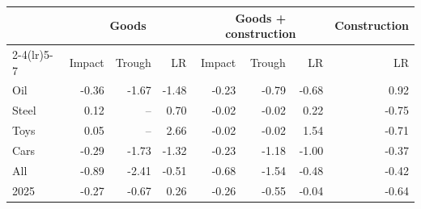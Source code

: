 \begin{tabular}{lrrrrrrr}
\toprule
 & \multicolumn{3}{c}{Goods} & \multicolumn{3}{c}{Goods + construction} & Construction \\
\cmidrule(lr){2-4}\cmidrule(lr){5-7}
 & Impact & Trough & LR & Impact & Trough & LR & LR \\
\midrule
Oil & -0.36 & -1.67 & -1.48 & -0.23 & -0.79 & -0.68 & 0.92 \\
Steel & 0.12 & -- & 0.70 & -0.02 & -0.02 & 0.22 & -0.75 \\
Toys & 0.05 & -- & 2.66 & -0.02 & -0.02 & 1.54 & -0.71 \\
Cars & -0.29 & -1.73 & -1.32 & -0.23 & -1.18 & -1.00 & -0.37 \\
All & -0.89 & -2.41 & -0.51 & -0.68 & -1.54 & -0.48 & -0.42 \\
2025 & -0.27 & -0.67 & 0.26 & -0.26 & -0.55 & -0.04 & -0.64 \\
\bottomrule
\end{tabular}
